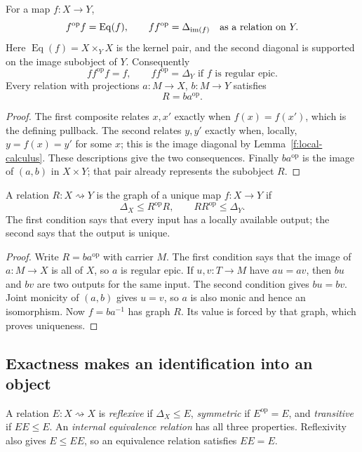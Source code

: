 \begin{lemma}\label{f:graph-kernel}
For a map $f:X\to Y$,
\[
f^{\mathrm{op}}f=\operatorname{Eq}(f),
\qquad
ff^{\mathrm{op}}=\Delta_{\operatorname{im}(f)}
\quad\text{as a relation on }Y.
\]
Here $\operatorname{Eq}(f)=X\times_YX$ is the kernel pair, and the second
diagonal is supported on the image subobject of $Y$. Consequently
\[
ff^{\mathrm{op}}f=f,
\qquad ff^{\mathrm{op}}=\Delta_Y
\text{ if }f\text{ is regular epic}.
\]
Every relation with projections $a:M\to X$, $b:M\to Y$ satisfies
\[
R=ba^{\mathrm{op}}.
\]
\end{lemma}
\begin{proof}
The first composite relates $x,x'$ exactly when $f(x)=f(x')$, which is
the defining pullback. The second relates $y,y'$ exactly when, locally,
$y=f(x)=y'$ for some $x$; this is the image diagonal by
Lemma~\ref{f:local-calculus}. These descriptions give the two
consequences. Finally $ba^{\mathrm{op}}$ is the image of $(a,b)$ in
$X\times Y$; that pair already represents the subobject $R$.
\end{proof}

\begin{lemma}\label{f:functional}
A relation $R:X\rightsquigarrow Y$ is the graph of a unique map
$f:X\to Y$ if
\[
\Delta_X\leq R^{\mathrm{op}}R,
\qquad RR^{\mathrm{op}}\leq\Delta_Y.
\]
The first condition says that every input has a locally available
output; the second says that the output is unique.
\end{lemma}
\begin{proof}
Write $R=ba^{\mathrm{op}}$ with carrier $M$. The first condition says
that the image of $a:M\to X$ is all of $X$, so $a$ is regular epic.
If $u,v:T\to M$ have $au=av$, then $bu$ and $bv$ are two outputs for
the same input. The second condition gives $bu=bv$. Joint monicity
of $(a,b)$ gives $u=v$, so $a$ is also monic and hence an isomorphism.
Now $f=ba^{-1}$ has graph $R$. Its value is forced by that graph,
which proves uniqueness.
\end{proof}

\subsection{Exactness makes an identification into an object}

A relation $E:X\rightsquigarrow X$ is \emph{reflexive} if
$\Delta_X\leq E$, \emph{symmetric} if $E^{\mathrm{op}}=E$, and
\emph{transitive} if $EE\leq E$. An \emph{internal equivalence relation}
has all three properties. Reflexivity also gives $E\leq EE$, so an
equivalence relation satisfies $EE=E$.

